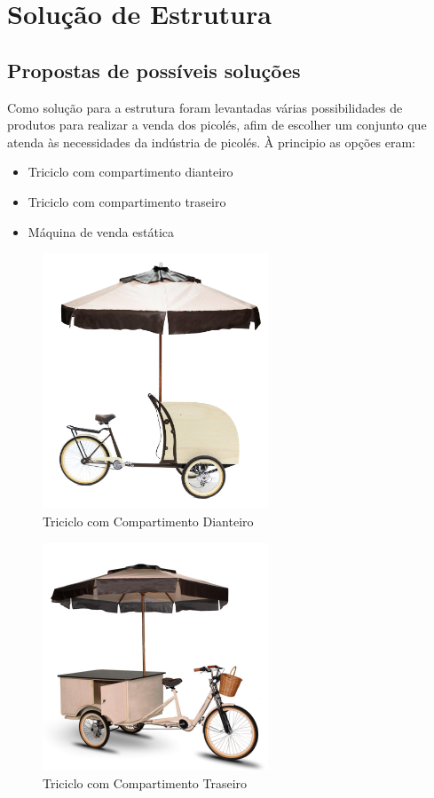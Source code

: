 \section{Solução de Estrutura}

\subsection{Propostas de possíveis soluções}
Como solução para a estrutura foram levantadas várias possibilidades de produtos para realizar a venda dos picolés, afim de escolher um conjunto que atenda às necessidades da indústria de picolés. À principio as opções eram:

\begin{itemize}
\item Triciclo com compartimento dianteiro
\item Triciclo com compartimento traseiro
\item Máquina de venda estática
\end{itemize} 

\begin{figure}[H]
	\centering
    \includegraphics[width=0.6\textwidth]{figuras/exemplo2}
    \caption{Triciclo com Compartimento Dianteiro}
    \label{fig:exemplo2}
\end{figure}

\begin{figure}[H]
	\centering
    \includegraphics[width=0.6\textwidth]{figuras/exemplo}
    \caption{Triciclo com Compartimento Traseiro}
    \label{fig:exemplo}
\end{figure}

